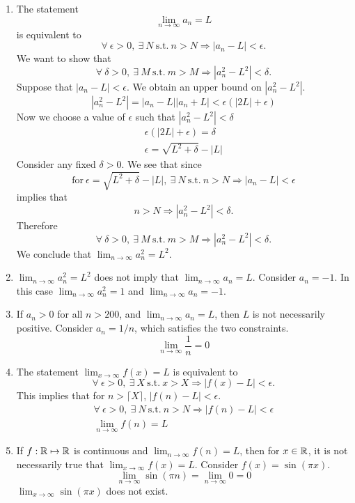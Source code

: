 \begin{Solution}
  \label{solution lim a = L lim a2 = L2}
  \begin{enumerate}
  \item 
    The statement 
    \[
    \lim_{n \to \infty} a_n = L
    \]
    is equivalent to
    \[
    \forall\ \epsilon > 0,\ \exists\ N\ \mathrm{s.t.}\ n > N \Rightarrow |a_n - L| < \epsilon.
    \]
    We want to show that
    \[
    \forall\ \delta > 0,\ \exists\ M\ \mathrm{s.t.}\ m > M \Rightarrow |a_n^2 - L^2| < \delta.
    \]
    Suppose that $|a_n - L| < \epsilon$.  We obtain an upper bound on 
    $|a_n^2 - L^2|$.
    \[
    |a_n^2 - L^2| = |a_n - L| |a_n + L| < \epsilon ( |2L| + \epsilon )
    \]
    Now we choose a value of $\epsilon$ such that $|a_n^2 - L^2| < \delta$
    \begin{gather*}
      \epsilon ( |2L| + \epsilon ) = \delta
      \\
      \epsilon  = \sqrt{ L^2 + \delta } - |L|
    \end{gather*}
    Consider any fixed $\delta > 0$.  We see that since
    \[
    \mathrm{for}\ \epsilon = \sqrt{ L^2 + \delta } - |L|,\ \exists\ N\ \mathrm{s.t.}\
    n > N \Rightarrow |a_n - L| < \epsilon
    \]
    implies that
    \[
    n > N \Rightarrow |a_n^2 - L^2| < \delta.
    \]
    Therefore
    \[
    \forall\ \delta > 0,\ \exists\ M\ \mathrm{s.t.}\ m > M \Rightarrow |a_n^2 - L^2| < \delta.
    \]
    We conclude that $\lim_{n \to \infty} a_n^2 = L^2$.
  \item 
    $\lim_{n \to \infty} a_n^2 = L^2$ does not imply that $\lim_{n \to \infty} a_n = L$.
    Consider $a_n = -1$.  In this case $\lim_{n \to \infty} a_n^2 = 1$ and 
    $\lim_{n \to \infty} a_n = -1$.
  \item 
    If $a_n > 0$ for all $n > 200$, and $\lim_{n \to \infty} a_n = L$, then $L$
    is not necessarily positive.  Consider $a_n = 1 / n$, which satisfies
    the two constraints.
    \[
    \lim_{n \to \infty} \frac{1}{n} = 0
    \]
  \item 
    The statement $\lim_{x \to \infty} f(x) = L$ is equivalent to
    \[
    \forall\ \epsilon > 0,\ \exists\ X\ \mathrm{s.t.}\ x > X \Rightarrow |f(x) - L| < \epsilon.
    \]
    This implies that for $n > \lceil X \rceil$, $|f(n) - L| < \epsilon$.
    \begin{gather*}
      \forall\ \epsilon > 0,\ \exists\ N\ \mathrm{s.t.}\ n > N \Rightarrow |f(n) - L| < \epsilon
      \\
      \lim_{n \to \infty} f(n) = L
    \end{gather*}
  \item 
    If $f : \mathbb{R} \mapsto \mathbb{R}$ is continuous and $\lim_{n \to \infty} f(n) = L$, then for 
    $x \in \mathbb{R}$, it is not necessarily true that $\lim_{x \to \infty} f(x) = L$.
    Consider $f(x) = \sin(\pi x)$.
    \[
    \lim_{n \to \infty} \sin(\pi n) = \lim_{n \to \infty} 0 = 0
    \]
    $\lim_{x \to \infty} \sin(\pi x)$ does not exist.
  \end{enumerate}
\end{Solution}
